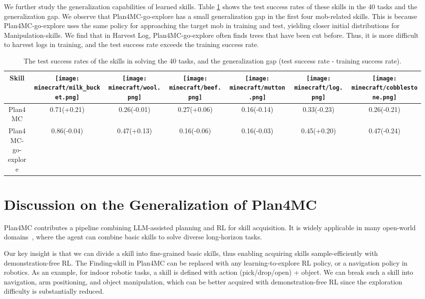 \documentclass{article}
\newcommand{\mcbeef}{\texttt{[image: minecraft/beef.png]}}
\newcommand{\mccobblestone}{\texttt{[image: minecraft/cobblestone.png]}}
\newcommand{\mclog}{\texttt{[image: minecraft/log.png]}}
\newcommand{\mcmilkbucket}{\texttt{[image: minecraft/milk\_bucket.png]}}
\newcommand{\mcmutton}{\texttt{[image: minecraft/mutton.png]}}
\newcommand{\mcwool}{\texttt{[image: minecraft/wool.png]}}
\begin{document}
We further study the generalization capabilities of learned skills. Table \ref{tab:skill-generalization-go-explore} shows the test success rates of these skills in the 40 tasks and the generalization gap. %
We observe that Plan4MC-go-explore has a small generalization gap in the first four mob-related skills. This is because Plan4MC-go-explore uses the same policy for approaching the target mob in training and test, yielding closer initial distributions for Manipulation-skills. We find that in Harvest Log, Plan4MC-go-explore often finds trees that have been cut before. Thus, it is more difficult to harvest logs in training, and the test success rate exceeds the training success rate.


\begin{table}[htbp]
  \caption{The test success rates of the skills in solving the 40 tasks, and the generalization gap (test success rate - training success rate).}
  \label{tab:skill-generalization-go-explore}
  \centering
  \begin{tabular}{ccccccc}
    \toprule
     Skill            & \mcmilkbucket & \mcwool & \mcbeef & \mcmutton & \mclog & \mccobblestone \\
    \midrule
    Plan4MC &	0.71(+0.21) &	0.26(-0.01) &	0.27(+0.06) &	0.16(-0.14) &	0.33(-0.23) &	0.26(-0.21) \\
    \makecell{Plan4MC- \\ go-explore} &	0.86(-0.04) &	0.47(+0.13) &	0.16(-0.06) &	0.16(-0.03) &	0.45(+0.20) &	0.47(-0.24) \\
    \bottomrule
  \end{tabular}
\end{table}



\section{Discussion on the Generalization of Plan4MC}
\label{appendix:discussion}

Plan4MC contributes a pipeline combining LLM-assisted planning and RL for skill acquisition. It is widely applicable in many open-world domains~\citep{saycan, behavior1k}, where the agent can combine basic skills to solve diverse long-horizon tasks.

Our key insight is that we can divide a skill into fine-grained basic skills, thus enabling acquiring skills sample-efficiently with demonstration-free RL. The Finding-skill in Plan4MC can be replaced with any learning-to-explore RL policy, or a navigation policy in robotics.
As an example, for indoor robotic tasks, a skill is defined with action (pick/drop/open) + object. We can break such a skill into navigation, arm positioning, and object manipulation, which can be better acquired with demonstration-free RL since the exploration difficulty is substantially reduced.
\end{document}
